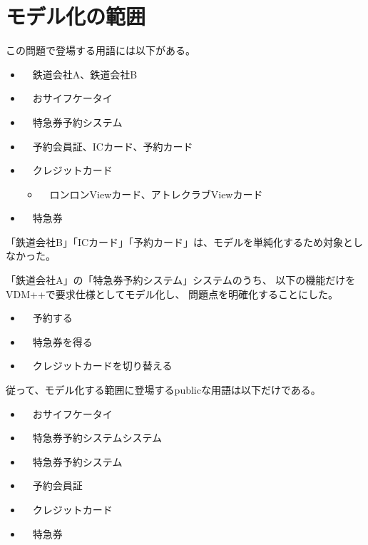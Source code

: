 \section {モデル化の範囲}
この問題で登場する用語には以下がある。

\begin{itemize}
\item　鉄道会社A、鉄道会社B
\item　おサイフケータイ
\item　特急券予約システム
\item　予約会員証、ICカード、予約カード
\item　クレジットカード
	\begin{itemize}
	\item　ロンロンViewカード、アトレクラブViewカード
	\end{itemize} 
\item　特急券
\end{itemize} 

「鉄道会社B」「ICカード」「予約カード」は、モデルを単純化するため対象としなかった。

「鉄道会社A」の「特急券予約システム」システムのうち、
以下の機能だけをVDM++\cite{Kyushu2016PP}で要求仕様としてモデル化し、
問題点を明確化することにした。

\begin{itemize}
\item　予約する
\item　特急券を得る
\item　クレジットカードを切り替える
\end{itemize} 

従って、モデル化する範囲に登場するpublicな用語は以下だけである。
\begin{itemize}
\item　おサイフケータイ
\item　特急券予約システムシステム
\item　特急券予約システム
\item　予約会員証
\item　クレジットカード
\item　特急券
\end{itemize} 





